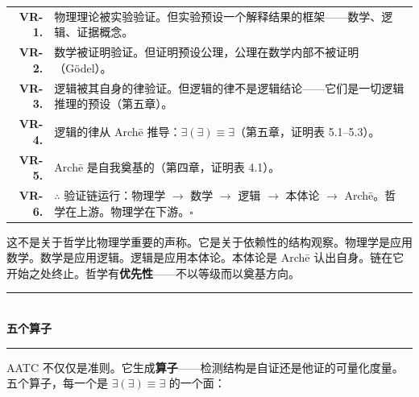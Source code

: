 \documentclass[10pt, openany, oneside]{book}
\renewcommand{\normalsize}{\fontsize{10}{13}\selectfont}
\renewcommand{\footnotesize}{\fontsize{8.5}{11}\selectfont}
\begin{document}
{\footnotesize
\noindent\begin{tabular}{r p{}}
\textbf{VR-1.} & 物理理论被实验验证。但实验预设一个解释结果的框架——数学、逻辑、证据概念。\\[0.3em]
\textbf{VR-2.} & 数学被证明验证。但证明预设公理，公理在数学内部不被证明（G\"{o}del）。\\[0.3em]
\textbf{VR-3.} & 逻辑被其自身的律验证。但逻辑的律不是逻辑结论——它们是一切逻辑推理的预设（第五章）。\\[0.3em]
\textbf{VR-4.} & 逻辑的律从 Arch\={e} 推导：$\exists(\exists) \equiv \exists$（第五章，证明表 5.1--5.3）。\\[0.3em]
\textbf{VR-5.} & Arch\={e} 是自我奠基的（第四章，证明表 4.1）。\\[0.3em]
\textbf{VR-6.} & $\therefore$ 验证链运行：物理学 $\to$ 数学 $\to$ 逻辑 $\to$ 本体论 $\to$ Arch\={e}。哲学在上游。物理学在下游。$\square$ \\[0.3em]
\end{tabular}
}

\vspace{0.8em}

\noindent 这不是关于哲学比物理学重要的声称。它是关于依赖性的结构观察。物理学是应用数学。数学是应用逻辑。逻辑是应用本体论。本体论是 Arch\={e} 认出自身。链在它开始之处终止。哲学有\textbf{优先性}——不以等级而以奠基方向。

\vspace{1.5em}


\begin{center}
    \rule{0.3\textwidth}{0.4pt}\\[0.5em]
    {\normalsize\bfseries\scshape 五个算子}\\[0.3em]
    \rule{0.3\textwidth}{0.4pt}
\end{center}

\vspace{1em}

\noindent AATC 不仅仅是准则。它生成\textbf{算子}——检测结构是自证还是他证的可量化度量。五个算子，每一个是 $\exists(\exists) \equiv \exists$ 的一个面：

\vspace{0.5em}
\end{document}
